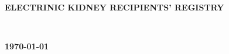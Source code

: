 \documentclass[12pt,a4paper]{report}
\begin{document}
\begin{titlepage}


\center %
{

\vspace*{\fill}
\fontsize{20pt}{30}\selectfont \textbf{\uppercase{ELECTRINIC KIDNEY RECIPIENTS' REGISTRY}}\\[1.5cm]
\vspace*{\fill}

\fontsize{16pt}{24}\selectfont{B GNANAKEETHAN} \\


\vspace*{\fill}

\fontsize{16pt}{24}\selectfont\textbf{\monthyeardate\today}
}

\vspace*{\fill}

\end{titlepage}
\end{document}
